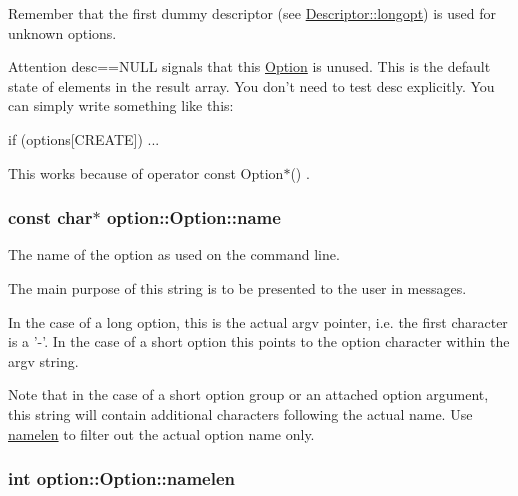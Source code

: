 \-Remember that the first dummy descriptor (see \hyperlink{structoption_1_1_descriptor_a470c449dfa894c9bfda2dae026142b4b}{\-Descriptor\-::longopt}) is used for unknown options.

\begin{DoxyAttention}{\-Attention}
{\ttfamily desc==\-N\-U\-L\-L} signals that this \hyperlink{classoption_1_1_option}{\-Option} is unused. \-This is the default state of elements in the result array. \-You don't need to test {\ttfamily desc} explicitly. \-You can simply write something like this\-: 
\begin{DoxyCode}
 if (options[CREATE])
 {
   ...
 }
\end{DoxyCode}
 \-This works because of {\ttfamily  operator const \-Option$\ast$() }. 
\end{DoxyAttention}
\hypertarget{classoption_1_1_option_a02a76b4896abd22d0ba8514362261de9}{
\subsubsection[{name}]{\setlength{\rightskip}{0pt plus 5cm}const char$\ast$ {\bf option\-::\-Option\-::name}}}\label{classoption_1_1_option_a02a76b4896abd22d0ba8514362261de9}


\-The name of the option as used on the command line. 

\-The main purpose of this string is to be presented to the user in messages.

\-In the case of a long option, this is the actual {\ttfamily argv} pointer, i.\-e. the first character is a '-\/'. \-In the case of a short option this points to the option character within the {\ttfamily argv} string.

\-Note that in the case of a short option group or an attached option argument, this string will contain additional characters following the actual name. \-Use \hyperlink{classoption_1_1_option_a3aa2957b19ad5815873441b415d56050}{namelen} to filter out the actual option name only. \hypertarget{classoption_1_1_option_a3aa2957b19ad5815873441b415d56050}{
\subsubsection[{namelen}]{\setlength{\rightskip}{0pt plus 5cm}int {\bf option\-::\-Option\-::namelen}}}\label{classoption_1_1_option_a3aa2957b19ad5815873441b415d56050}


